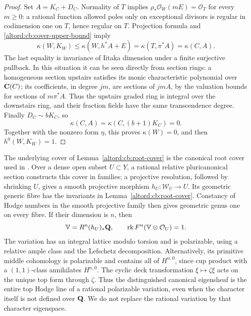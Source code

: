 \begin{proof}
Set \(A=K_C+D_C\).  Normality of \(T\) implies
\(\rho_*\mathcal O_W(mE)=\mathcal O_T\) for every \(m\geq0\):
a rational function allowed poles only on exceptional divisors is
regular in codimension one on \(T\), hence regular on \(T\).
Projection formula and \eqref{altord:cb:cover-upper-bound} imply
\[
 \kappa(W,K_W)
 \leq \kappa(W,h^*A+E)
 =\kappa(T,\pi^*A)
 =\kappa(C,A).
\]
The last equality is invariance of Iitaka dimension under a finite
surjective pullback.  In this situation it can be seen directly
from section rings: a homogeneous section upstairs satisfies its
monic characteristic polynomial over \(\mathbf C(C)\); its coefficients,
in degree \(jm\), are sections of \(jmA\), by the valuation bounds
for sections of \(m\pi^*A\).  Thus the upstairs graded ring is
integral over the downstairs ring, and their fraction fields have
the same transcendence degree.
Finally \(D_C\sim bK_C\), so
\[
 \kappa(C,A)=\kappa(C,(b+1)K_C)=0.
\]
Together with the nonzero form \(\eta\), this proves
\(\kappa(W)=0\), and then \(h^0(W,K_W)=1\).
\end{proof}

The underlying cover of Lemma~\ref{altord:cb:root-cover} is the
canonical root cover used in
\cite[Remark~2.6 and Theorem~3.1]{FujinoMori}.
Over a dense open subset \(U\subset Y\), a rational relative
pluricanonical section constructs this cover in families; a
projective resolution, followed by shrinking \(U\), gives a smooth
projective morphism \(h_U:\mathcal W_U\to U\).
Its geometric generic fibre has the invariants in
Lemma~\ref{altord:cb:root-cover}. Constancy of Hodge numbers in the smooth
projective family then gives geometric genus one on every fibre.
If their dimension is \(n\), then
\[
 \mathbb V=R^n(h_U)_*\mathbf Q,\qquad
 \operatorname{rk} F^n(\mathbb V\otimes\mathcal O_U)=1.
\]
The variation has an integral lattice modulo torsion and is
polarizable, using a relative ample class and the Lefschetz
decomposition.  Alternatively, its primitive middle cohomology
is polarizable and contains all of \(H^{n,0}\), since cup product
with a \((1,1)\)-class annihilates \(H^{n,0}\).
The cyclic deck transformation \(\xi\mapsto\zeta\xi\) acts on the
unique top form through \(\zeta\).  Thus the distinguished
canonical eigensheaf is the entire top Hodge line of a rational
polarizable variation, even when the character itself is not
defined over \(\mathbf Q\).  We do not replace the rational variation by
that character eigenspace.

